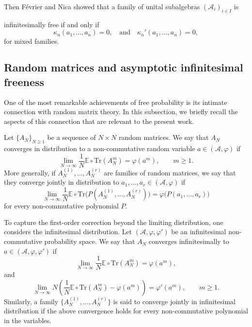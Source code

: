 \documentclass{article}
\theoremstyle{definition}
\newcommand{\Tr}{\text{Tr}}
\begin{document}
Then F{\'e}vrier and Nica showed that a family of unital subalgebras $(\mathcal A_i)_{i\in I}$ is {infinitesimally free if and only if 
\[
\kappa_n(a_1,\ldots,a_n)=0, \quad \text{and}\quad \kappa_n'(a_1,\ldots,a_n)=0,
\]
for mixed families. 

\subsection{Random matrices and asymptotic infinitesimal freeness}

One of the most remarkable achievements of free probability is its intimate connection with random matrix theory. In this subsection, we briefly recall the aspects of this connection that are relevant to the present work.

Let $\{A_N\}_{N\ge1}$ be a sequence of $N\times N$ random matrices. We say that
$A_N$ converges in distribution to a non-commutative random variable
$a\in(\mathcal A,\varphi)$ if
\[
\lim_{N\to\infty}
\frac1N\mathbb E\circ\Tr(A_N^m)
=
\varphi(a^m),
\qquad
m\ge1.
\]
More generally, if
$A_N^{(1)},\ldots,A_N^{(r)}$
are families of random matrices, we say that they converge jointly in
distribution to
$a_1,\ldots,a_r\in(\mathcal A,\varphi)$
if
\[
\lim_{N\to\infty}
\frac1N
\mathbb E\circ\Tr
\bigl(
P(A_N^{(1)},\ldots,A_N^{(r)})
\bigr)
=
\varphi
\bigl(
P(a_1,\ldots,a_r)
\bigr)
\]
for every non-commutative polynomial $P$.


To capture the first-order correction beyond the limiting distribution, one
considers the infinitesimal distribution. Let
$(\mathcal A,\varphi,\varphi')$
be an infinitesimal non-commutative probability space. We say that
$A_N$ converges infinitesimally to
$a\in(\mathcal A,\varphi,\varphi')$
if
\[
\lim_{N\to\infty}
\frac1N\mathbb E\circ\Tr(A_N^m)
=
\varphi(a^m),
\]
and
\[
\lim_{N\to\infty}
N\left(
\frac1N\mathbb E\circ\Tr(A_N^m)
-
\varphi(a^m)
\right)
=
\varphi'(a^m),
\qquad
m\ge1.
\]
Similarly, a family
$\{A_N^{(1)},\ldots,A_N^{(r)}\}$
is said to converge jointly in infinitesimal distribution if the above
convergence holds for every non-commutative polynomial in the variables.

}
\end{document}
